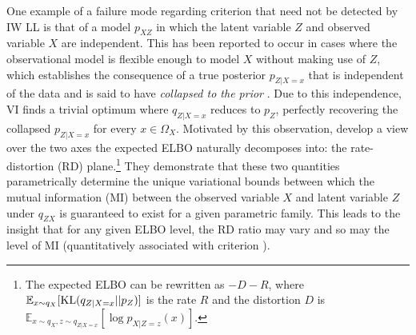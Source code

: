 One example of a failure mode regarding criterion \enumtwo that need not be detected by IW LL is that of a model $p_{XZ}$ in which the latent variable $Z$ and observed variable $X$ are independent. This has been reported to occur in cases where the observational model is flexible enough to model $X$ without making use of $Z$, which establishes the consequence of a true posterior $p_{Z|X=x}$ that is independent of the data and is said to have \textit{collapsed to the prior} \citep{chen2016variational, bowman2015generating}. Due to this independence, VI finds a trivial optimum where $q_{Z|X=x}$ reduces to $p_Z$, perfectly recovering  the collapsed $p_{Z|X=x}$ for every $x \in \Omega_X$.  %
Motivated by this observation, \citet{alemi2018fixing} develop a view over the two axes the expected ELBO naturally decomposes into: the rate-distortion (RD) plane.\footnote{The expected ELBO can be rewritten as $-D - R$, where $\mathbb E_{x \sim q_X}[\operatorname{KL}(q_{Z|X=x}||p_Z)]$ is the rate $R$ and the distortion $D$ is $\mathbb E_{x \sim q_{X}, z \sim q_{Z|X=x}}[\log p_{X|Z=z}(x)]$.} They demonstrate that these two quantities parametrically determine the unique variational bounds between which the mutual information (MI) between the observed variable $X$ and latent variable $Z$ under $q_{ZX}$ is guaranteed to exist for a given parametric family. This leads to the insight that for any given ELBO level, the RD ratio may vary and so may the level of MI (quantitatively associated with criterion \enumtwo). 


